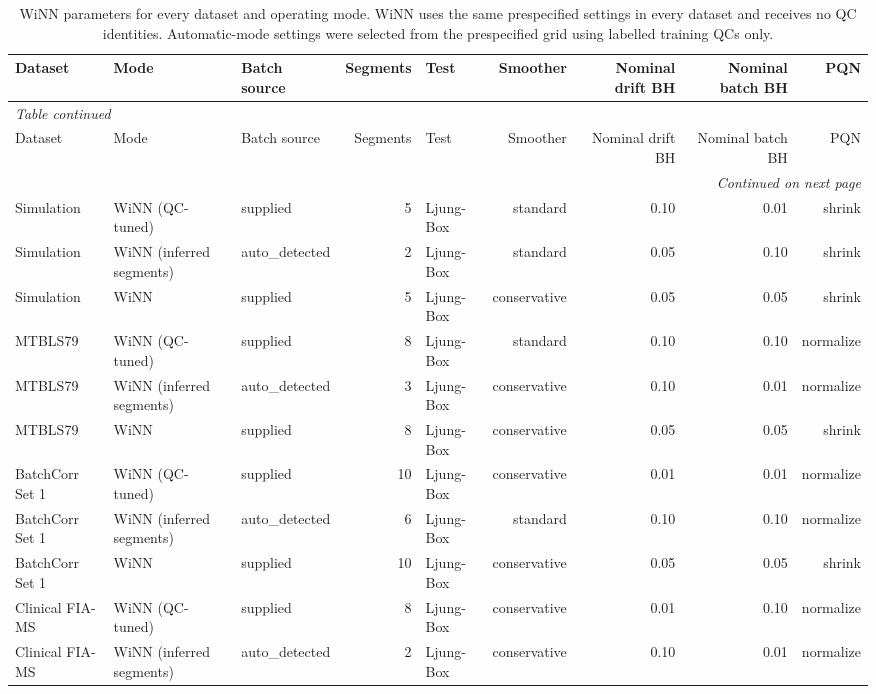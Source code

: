 \begin{landscape}
\tiny
\begin{longtable}{lllrlrrrr}
\caption{WiNN parameters for every dataset and operating mode. WiNN uses the same prespecified settings in every dataset and receives no QC identities. Automatic-mode settings were selected from the prespecified grid using labelled training QCs only.}\label{tab:supp_winn_parameters}\\
\toprule
Dataset & Mode & Batch source & Segments & Test & Smoother & Nominal drift BH & Nominal batch BH & PQN \\
\midrule
\endfirsthead
\multicolumn{9}{l}{\textit{Table \thetable{} continued}}\\
\toprule
Dataset & Mode & Batch source & Segments & Test & Smoother & Nominal drift BH & Nominal batch BH & PQN \\
\midrule
\endhead
\midrule
\multicolumn{9}{r}{\textit{Continued on next page}}\\
\endfoot
\bottomrule
\endlastfoot
Simulation & WiNN (QC-tuned) & supplied & 5 & Ljung-Box & standard & 0.10 & 0.01 & shrink \\
Simulation & WiNN (inferred segments) & auto\_detected & 2 & Ljung-Box & standard & 0.05 & 0.10 & shrink \\
Simulation & WiNN & supplied & 5 & Ljung-Box & conservative & 0.05 & 0.05 & shrink \\
MTBLS79 & WiNN (QC-tuned) & supplied & 8 & Ljung-Box & standard & 0.10 & 0.10 & normalize \\
MTBLS79 & WiNN (inferred segments) & auto\_detected & 3 & Ljung-Box & conservative & 0.10 & 0.01 & normalize \\
MTBLS79 & WiNN & supplied & 8 & Ljung-Box & conservative & 0.05 & 0.05 & shrink \\
BatchCorr Set 1 & WiNN (QC-tuned) & supplied & 10 & Ljung-Box & conservative & 0.01 & 0.01 & normalize \\
BatchCorr Set 1 & WiNN (inferred segments) & auto\_detected & 6 & Ljung-Box & standard & 0.10 & 0.10 & normalize \\
BatchCorr Set 1 & WiNN & supplied & 10 & Ljung-Box & conservative & 0.05 & 0.05 & shrink \\
Clinical FIA-MS & WiNN (QC-tuned) & supplied & 8 & Ljung-Box & conservative & 0.01 & 0.10 & normalize \\
Clinical FIA-MS & WiNN (inferred segments) & auto\_detected & 2 & Ljung-Box & conservative & 0.10 & 0.01 & normalize \\

\end{longtable}
\end{landscape}
